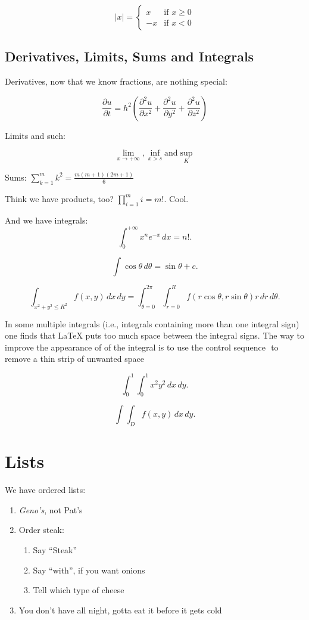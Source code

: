 \documentclass[a4paper,12pt,titlepage]{article}
\begin{document}
	\[ |x| = \left\{
		\begin{array}{ll}
			 x & \mbox{if $x \geq 0$}\\
			-x & \mbox{if $x < 0$}
		\end{array} \right. \] 


\subsection*{Derivatives, Limits, Sums and Integrals}

Derivatives, now that we know fractions, are nothing special:

	\[ \frac{\partial u}{\partial t}
		 = h^2 \left( \frac{\partial^2 u}{\partial x^2}
      + \frac{\partial^2 u}{\partial y^2}
      + \frac{\partial^2 u}{\partial z^2} \right) \]

Limits and such:

	\[ \lim_{x \to +\infty}, \inf_{x > s} \mbox{and} \sup_K  \]

Sums:  $ \sum_{k=1}^m k^2 = \frac{m (m+1) (2m+1)}{6} $

Think we have products, too?  $\prod_{i=1}^m i = m! $.  Cool.

And we have integrals:
    \[ \int_0^{+\infty} x^n e^{-x} \,dx = n!.\] 

    \[ \int \cos \theta \,d\theta = \sin \theta + c.\] 

    \[ \int_{x^2 + y^2 \leq R^2} f(x,y)\,dx\,dy
       = \int_{\theta=0}^{2\pi} \int_{r=0}^R
          f(r\cos\theta,r\sin\theta) r\,dr\,d\theta.\] 

In some multiple integrals (i.e., integrals containing more than one integral
sign) one finds that LaTeX puts too much space between the integral signs. The
way to improve the appearance of of the integral is to use the control sequence
$\!$ to remove a thin strip of unwanted space

	\[ \int_0^1 \! \int_0^1 x^2 y^2\,dx\,dy. \] 

	\[ \int \!\!\! \int_D f(x,y)\,dx\,dy. \]


\section*{Lists}

We have ordered lists:

\begin{enumerate}
	\item \emph{Geno's}, not Pat's
	\item Order steak:
		\begin{enumerate}
			\item Say ``Steak''
			\item Say ``with'', if you want onions
			\item Tell which type of cheese
		\end{enumerate}
	\item You don't have all night, gotta eat it before it gets cold
\end{enumerate}
\end{document}

